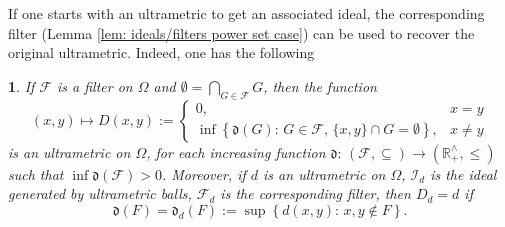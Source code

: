 \documentclass[11pt,british,reqno]{article}
\numberwithin{equation}{section}
\numberwithin{figure}{section}
\numberwithin{table}{section}
\theoremstyle{definition}
\theoremstyle{definition}
\theoremstyle{plain}
\theoremstyle{plain}
\theoremstyle{remark}
\theoremstyle{plain}
\newtheorem{corollary}{\protect\corollaryname}
\numberwithin{equation}{section}
\numberwithin{figure}{section}
\numberwithin{table}{section}
\theoremstyle{plain}
\providecommand{\corollaryname}{Corollary}
\begin{document}
If one starts with an ultrametric to get an associated ideal, the
corresponding filter (Lemma \ref{lem: ideals/filters power set case})
can be used to recover the original ultrametric. Indeed, one has the
following 
\begin{corollary}
\label{cor: filter to ultrametric and back} If $\mathcal{F}$ is
a filter on $\Omega$ and ${\displaystyle \emptyset=\bigcap_{G\in\mathcal{F}}G}$,
then the function 
\begin{equation}
(x,y)\mapsto D(x,y):=\left\{ \begin{array}{cc}
0, & x=y\\
\inf\left\{ \mathfrak{d}(G):\,G\in\mathcal{F},\,\{x,y\}\cap G=\emptyset\right\} , & x\neq y
\end{array}\right.\label{eq: filter to ultrametric}
\end{equation}
is an ultrametric on $\Omega$, for each increasing function $\mathfrak{d}:\,(\mathcal{F},\subseteq)\longrightarrow(\mathbb{R}_{+}^{\wedge},\leq)$
such that $\inf\mathfrak{d}(\mathcal{F})>0$. Moreover, if $d$ is
an ultrametric on $\Omega$, $\mathcal{I}_{d}$ is the ideal generated
by ultrametric balls, $\mathcal{F}_{d}$ is the corresponding filter,
then $D_{d}=d$ if 
\begin{equation}
\mathfrak{d}(F)=\mathfrak{d}_{d}(F):=\sup\left\{ d(x,y):\,x,y\notin F\right\} .\label{eq: ultradiameter}
\end{equation}
\end{corollary}
\end{document}
